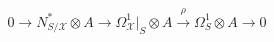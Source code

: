 
\[
0\longrightarrow N^*_{S/\mathcal X}\otimes A
\longrightarrow\Omega^1_{\mathcal X}|_S\otimes A
\xrightarrow{\rho}\Omega^1_S\otimes A\longrightarrow0
\tag{W.1}\label{wbII:eq:W:5.1}
\]

